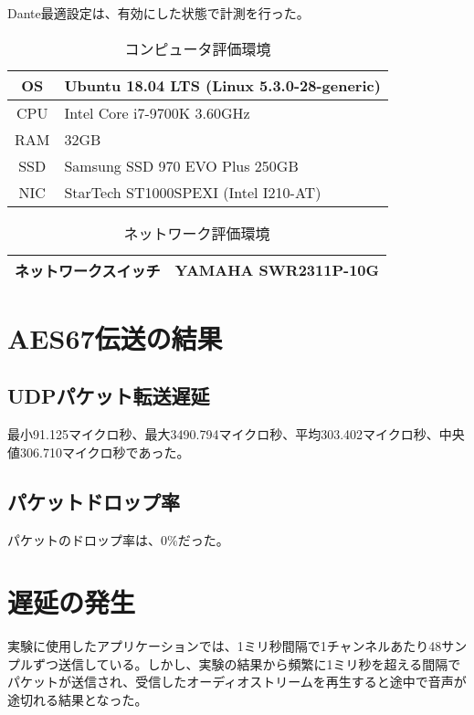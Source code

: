 Dante最適設定は、有効にした状態で計測を行った。

\begin{table}[htb]
  \label{tab:evaluation_computer}
  \caption{コンピュータ評価環境}
  \centering
  \begin{tabular}{c|l} \hline
    OS & Ubuntu 18.04 LTS (Linux 5.3.0-28-generic)\\ \hline
    CPU & Intel Core i7-9700K 3.60GHz \\ \hline
    RAM & 32GB \\ \hline
    SSD & Samsung SSD 970 EVO Plus 250GB \\ \hline
    NIC & StarTech ST1000SPEXI (Intel I210-AT) \\ \hline
  \end{tabular}
\end{table}

\begin{table}[htb]
  \label{tab:evaluation_network}
  \caption{ネットワーク評価環境}
  \centering
  \begin{tabular}{c|l} \hline
    ネットワークスイッチ & YAMAHA SWR2311P-10G \\ \hline
  \end{tabular}
\end{table}

\section{AES67伝送の結果}

\subsection{UDPパケット転送遅延}

最小91.125マイクロ秒、最大3490.794マイクロ秒、平均303.402マイクロ秒、中央値306.710マイクロ秒であった。

\subsection{パケットドロップ率}

パケットのドロップ率は、0\%だった。

\section{遅延の発生}
\label{sec:evaluation_latency}

実験に使用したアプリケーションでは、1ミリ秒間隔で1チャンネルあたり48サンプルずつ送信している。しかし、実験の結果から頻繁に1ミリ秒を超える間隔でパケットが送信され、受信したオーディオストリームを再生すると途中で音声が途切れる結果となった。
